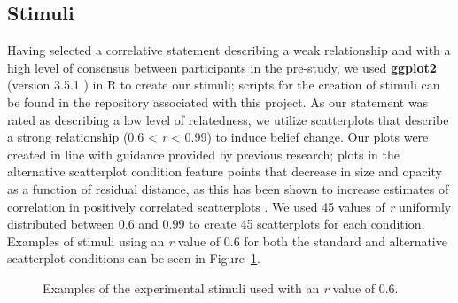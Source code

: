 \documentclass[sigconf]{acmart}
\begin{document}
\subsection{Stimuli}\label{sec-stimuli-main}

Having selected a correlative statement describing a weak relationship
and with a high level of consensus between participants in the
pre-study, we used \textbf{ggplot2} (version 3.5.1 \citep{ggplot}) in R
to create our stimuli; scripts for the creation of stimuli can be found
in the repository associated with this project. As our statement was
rated as describing a low level of relatedness, we utilize scatterplots
that describe a strong relationship (0.6 \textless{} \emph{r}
\textless{} 0.99) to induce belief change. Our plots were created in
line with guidance provided by previous research; plots in the
alternative scatterplot condition feature points that decrease in size
and opacity as a function of residual distance, as this has been shown
to increase estimates of correlation in positively correlated
scatterplots \citep{strain_2023, strain_2023b, strain_2024}. We used 45
values of \emph{r} uniformly distributed between 0.6 and 0.99 to create
45 scatterplots for each condition. Examples of stimuli using an
\emph{r} value of 0.6 for both the standard and alternative scatterplot
conditions can be seen in Figure~\ref{fig-main-examples}.

\begin{figure}


\caption{\label{fig-main-examples}Examples of the experimental stimuli
used with an \textit{r} value of 0.6.}

\end{figure}%
\end{document}

